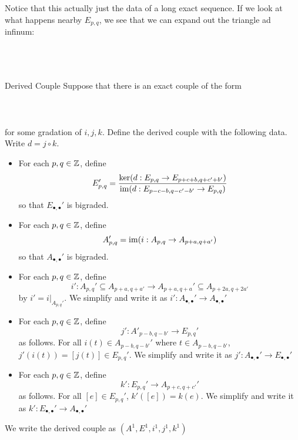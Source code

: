 \documentclass[a4paper]{article}
\begin{document}
Notice that this actually just the data of a long exact sequence. If we look at what happens nearby $E_{p,q}$, we see that we can expand out the triangle ad infinum: \\~\\
\\~\\

\begin{defn}{Derived Couple}{} Suppose that there is an exact couple of the form \\~\\
\\~\\ for some gradation of $i,j,k$. Define the derived couple with the following data. Write $d=j\circ k$. 
\begin{itemize}
\item For each $p,q\in\mathbb{Z}$, define $$E_{p,q}'=\frac{\ker(d:E_{p,q}\to E_{p+c+b,q+c'+b'})}{\operatorname{im}(d:E_{p-c-b,q-c'-b'}\to E_{p,q})}$$ so that $E_{\bullet,\bullet}'$ is bigraded. 
\item For each $p,q\in\mathbb{Z}$, define $$A_{p,q}'=\operatorname{im}(i:A_{p,q}\to A_{p+a,q+a'})$$ so that $A_{\bullet,\bullet}'$ is bigraded. 
\item For each $p,q\in\mathbb{Z}$, define $$i':A_{p,q}'\subseteq A_{p+a,q+a'}\to A_{p+a,q+a}'\subseteq A_{p+2a,q+2a'}$$ by $i'=i|_{A_{p,q}'}$. We simplify and write it as $i':A_{\bullet,\bullet}'\to A_{\bullet,\bullet}'$
\item For each $p,q\in\mathbb{Z}$, define $$j':A'_{p-b,q-b'}\to E_{p,q}'$$ as follows. For all $i(t)\in A_{p-b,q-b'}'$ where $t\in A_{p-b,q-b'}$, $j'(i(t))=[j(t)]\in E_{p,q}'$. We simplify and write it as $j':A_{\bullet,\bullet}'\to E_{\bullet,\bullet}'$
\item For each $p,q\in\mathbb{Z}$, define $$k':E_{p,q}'\to A_{p+c,q+c'}'$$ as follows. For all $[e]\in E_{p,q}'$, $k'([e])=k(e)$. We simplify and write it as $k':E_{\bullet,\bullet}'\to A_{\bullet,\bullet}'$
\end{itemize}
We write the derived couple as $(A^1,E^1,i^1,j^1,k^1)$
\end{defn}
\end{document}
